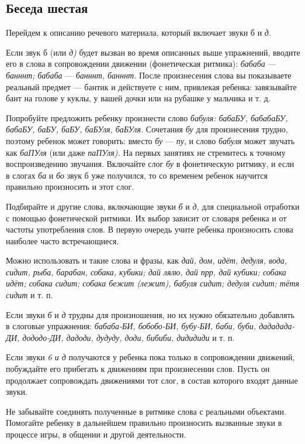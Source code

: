 \documentclass{book}
\renewcommand{\emph}[1]{\textit{#1}}
\begin{document}
\subsection*{Беседа шестая}

Перейдем к описанию речевого материала, который включает звуки б и
\emph{д.}

Если звук б (или \emph{д)} будет вызван во время описанных выше
упражнений, вводите его в слова в сопровождении движении (фонетическая
ритмика): \emph{бабаба} --- \emph{банннт; бабаба} --- \emph{банннт,
банннт.} После произнесения слова вы показываете реальный предмет ---
бантик и действуете с ним, привлекая ребенка: завязывайте бант на голове
у куклы, у вашей дочки или на рубашке у мальчика и т. д.

Попробуйте предложить ребенку произнести слово \emph{бабуля: бабаБУ,
бабабаБУ, бабаБУ, баБУ, баБУ, баБУля, баБУля.} Сочетания \emph{бу} для
произнесения трудно, поэтому ребенок может говорить: вместо \emph{бу}
--- \emph{пу}, и слово \emph{бабуля} может звучать как \emph{баПУля}
(или даже \emph{паПУля).} На первых занятиях не стремитесь к точному
воспроизведению звучания. Включайте слог \emph{бу} в фонетическую
ритмику, и если в слогах \emph{ба} и \emph{бо} звук б уже получился, то
со временем ребенок научится правильно произносить и этот слог.

Подбирайте и другие слова, включающие звуки \emph{б} и \emph{д,} для
специальной отработки с помощью фонетической ритмики. Их выбор зависит
от словаря ребенка и от частоты употребления слов. В первую очередь
учите ребенка произносить слова наиболее часто встречающиеся.

Можно использовать и такие слова и фразы, как \emph{дай, дом, идёт,
дедуля, вода, сидит, рыба, барабан, собака, кубики; дай лялю, дай прр,
дай кубики; собака идёт; собака сидит; собака бежит (лежит), бабуля
сидит; дедуля сидит; тётя сидит} и т. п.

Если звуки \emph{б} и \emph{д} трудны для произношения, но их нужно
обязательно добавлять в слоговые упражнения: \emph{бабаба-БИ, бобобо-БИ,
бубу-БИ, баби, буби, дададада-ДИ, дододо-ДИ, дадоди, дудуду, доди,
бибиби, дидидиди} и т. п.

Если звуки \emph{6 и д} получаются у ребенка пока только в сопровождении
движений, побуждайте его прибегать к движениям при произнесении слов.
Пусть он продолжает сопровождать движениями тот слог, в состав которого
входят данные звуки.

Не забывайте соединять полученные в ритмике слова с реальными объектами.
Помогайте ребенку в дальнейшем правильно произносить вызванные звуки в
процессе игры, в общении и другой деятельности.
\end{document}
